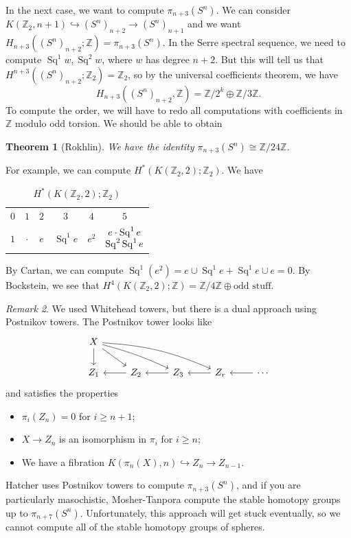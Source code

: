 \documentclass[leqno, openany]{memoir}
\newtheorem{thm}{Theorem}[section]
\theoremstyle{definition}
\theoremstyle{remark}
\newtheorem{rmk}[thm]{Remark}
\theoremstyle{plain}
\theoremstyle{definition}
\theoremstyle{remark}
\newcommand{\Z}{\mathbb{Z}}
\DeclareMathOperator{\Sq}{Sq}
\begin{document}
In the next case, we want to compute $\pi_{n+3}(S^n)$. We can consider $K(\Z_2,
n+1) \hookrightarrow {(S^n)}_{n+2} \to {(S^n)}_{n+1}$ and we want
$H_{n+3}({(S^n)}_{n+2}; \Z) = \pi_{n+3}(S^n)$. In the Serre spectral sequence,
we need to compute $\Sq^1 w, \Sq^2 w$, where $w$ has degree $n+2$. But this
will tell us that $H^{n+3}({(S^n)}_{n+2}; \Z_2) = \Z_2$, so by the universal
coefficients theorem, we have \[ H_{n+3}({(S^n)}_{n+2}, \Z) = \Z/2^k \oplus
\Z/3\Z. \] To compute the order, we will have to redo all computations with
coefficients in $\Z$ modulo odd torsion. We should be able to obtain
\begin{thm}[Rokhlin] We have the identity $\pi_{n+3}(S^n) \cong \Z/24 \Z$.
\end{thm} For example, we can compute $H^*(K(\Z_2, 2); \Z_2)$. We have
\begin{table}[H] \centering \caption{$H^*(K(\Z_2, 2); \Z_2)$} \label{tab:label}
    \begin{tabular}{cccccc} \toprule $0$ & $1$ & $2$ & $3$ & $4$ & $5$ \\ $1$ &
        $\cdot$ & $e$ & $\Sq^1 e$ & $e^2$ & $\Vectorstack{{e \cdot \Sq^1 e}
        {\Sq^2 \Sq^1 e}}$ \\ \bottomrule \end{tabular} \end{table} By Cartan,
        we can compute $\Sq^1(e^2) = e \cup \Sq^1 e + \Sq^1 e \cup e = 0$. By
        Bockstein, we see that $H^4(K(\Z_2, 2); \Z) = \Z/4\Z \oplus \text{odd
        stuff}$.

\begin{rmk} We used Whitehead towers, but there is a dual approach using
    Postnikov towers. The Postnikov tower looks like \begin{equation*}
        \begin{tikzcd} X \ar{d} \ar{dr} \ar[bend left=5]{drr} \ar[bend
            left=10]{drrr} \\ Z_1 & Z_2 \ar{l} & Z_3 \ar{l} & Z_r \ar{l} &
            \cdots \ar{l} \end{tikzcd} \end{equation*} and satisfies the
            properties \begin{itemize} \item $\pi_i(Z_n) = 0$ for $i \geq n+1$;
                \item $X \to Z_n$ is an isomorphism in $\pi_i$ for $i \geq n$;
                \item We have a fibration $K(\pi_n(X), n) \hookrightarrow Z_n
                    \to Z_{n-1}$.  \end{itemize} \end{rmk} Hatcher uses
                    Postnikov towers to compute $\pi_{n+3}(S^n)$, and if you
                    are particularly masochistic, Mosher-Tanpora compute the
                    stable homotopy groups up to $\pi_{n+7}(S^n)$.
                    Unfortunately, this approach will get stuck eventually, so
                    we cannot compute all of the stable homotopy groups of
                    spheres.
\end{document}
